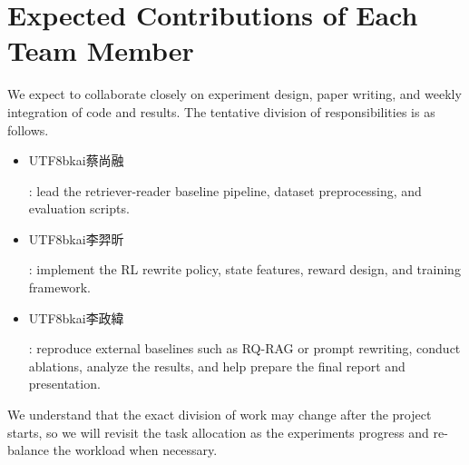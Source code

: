 \section{Expected Contributions of Each Team Member}
We expect to collaborate closely on experiment design, paper writing, and weekly integration of code and results. The tentative division of responsibilities is as follows.
\begin{itemize}
    \item \begin{CJK*}{UTF8}{bkai}蔡尚融\end{CJK*}: lead the retriever-reader baseline pipeline, dataset preprocessing, and evaluation scripts.
    \item \begin{CJK*}{UTF8}{bkai}李羿昕\end{CJK*}: implement the RL rewrite policy, state features, reward design, and training framework.
    \item \begin{CJK*}{UTF8}{bkai}李政緯\end{CJK*}: reproduce external baselines such as RQ-RAG or prompt rewriting, conduct ablations, analyze the results, and help prepare the final report and presentation.
\end{itemize}

We understand that the exact division of work may change after the project starts, so we will revisit the task allocation as the experiments progress and re-balance the workload when necessary.
